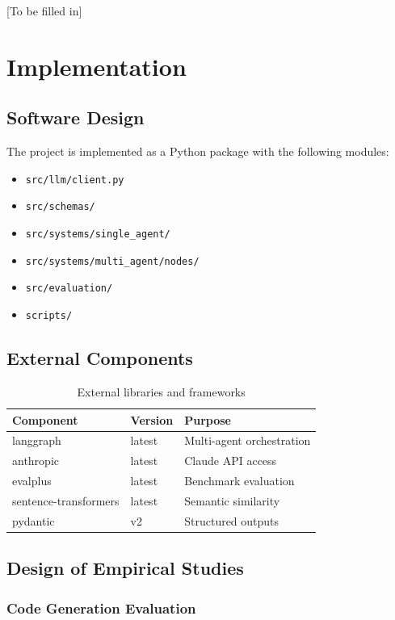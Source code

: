 \documentclass[11pt]{article}
\begin{document}
[To be filled in]

\section{Implementation}

\subsection{Software Design}

The project is implemented as a Python package with the following modules:

\begin{itemize}
    \item \texttt{src/llm/client.py}
    \item \texttt{src/schemas/}
    \item \texttt{src/systems/single\_agent/}
    \item \texttt{src/systems/multi\_agent/nodes/}
    \item \texttt{src/evaluation/}
    \item \texttt{scripts/}
\end{itemize}

\subsection{External Components}

\begin{table}[h]
\centering
\begin{tabular}{lll}
\toprule
Component & Version & Purpose \\
\midrule
langgraph & latest & Multi-agent orchestration \\
anthropic & latest & Claude API access \\
evalplus & latest & Benchmark evaluation \\
sentence-transformers & latest & Semantic similarity \\
pydantic & v2 & Structured outputs \\
\bottomrule
\end{tabular}
\caption{External libraries and frameworks}
\end{table}

\subsection{Design of Empirical Studies}

\subsubsection*{Code Generation Evaluation}
\end{document}
